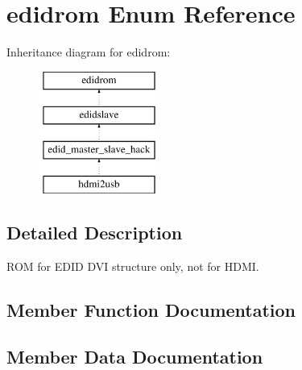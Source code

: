 \section{edidrom Enum Reference}
\label{enum1edidrom}
Inheritance diagram for edidrom\-:\begin{figure}[H]
\begin{center}
\leavevmode
\includegraphics[height=4.000000cm]{enum1edidrom}
\end{center}
\end{figure}


\subsection{Detailed Description}
R\-O\-M for E\-D\-I\-D D\-V\-I structure only, not for H\-D\-M\-I. 

\subsection{Member Function Documentation}
\subsubsection[{P\-R\-O\-C\-E\-S\-S\-\_\-15}]{\setlength{\rightskip}{0pt plus 5cm}\hspace{0.3cm}}\label{enum1edidrom_a8ee64d1327298358d5f75867875249ca}


\subsection{Member Data Documentation}
\subsubsection[{clk}]{ {\bfseries \textcolor{vhdlchar}{ }} \hspace{0.3cm}}\label{enum1edidrom_ab908b9f751dbba4c537c2f1741d76f23}
